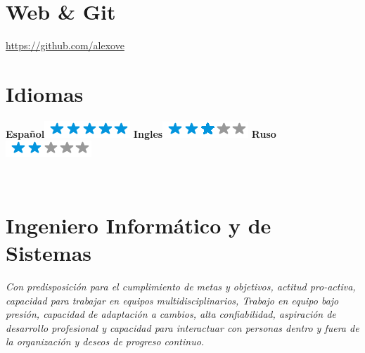 \documentclass[]{friggeri-cv}
\begin{document}
\begin{aside}
    \section{Web \& Git}
    \href{https://github.com/alexove}{https://github.com/alexove}
    ~
    \section{Idiomas}
    \textbf{Espa\~nol}\includegraphics[scale=0.40]{img/5stars.png}
    \textbf{Ingles}\includegraphics[scale=0.40]{img/3stars.png}
    \textbf{Ruso}\includegraphics[scale=0.40]{img/2stars.png}
    ~
\end{aside}
~
\section{Ingeniero Inform\'atico y de Sistemas}
\emph{Con predisposici\'on para el cumplimiento de metas y objetivos, actitud pro-activa,
capacidad para trabajar en equipos multidisciplinarios, Trabajo en equipo bajo presi\'on,
capacidad de adaptaci\'on a cambios, alta confiabilidad, aspiraci\'on de desarrollo
profesional y capacidad para interactuar con personas dentro y fuera de la organizaci\'on y
deseos de progreso continuo.}
\\
\end{document}
